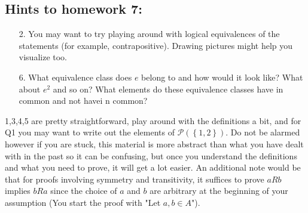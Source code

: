 \documentclass[letterpaper,12pt]{article}
\newcommand{\set}[1]{\left\{ #1 \right\}}
\begin{document}
\subsection*{Hints to homework 7:}
\begin{enumerate}
\item[2.] You may want to try playing around with logical equivalences of the statements (for example, contrapositive). Drawing pictures might help you visualize too.
\item[6.] What equivalence class does $e$ belong to and how would it look like? What about $e^2$ and so on? What elements do these equivalence classes have in common and not havei n common?
\end{enumerate}
1,3,4,5 are pretty straightforward, play around with the definitions a bit, and for Q1 you may want to write out the elements of $\mathcal{P}(\set{1,2})$. Do not be alarmed however if you are stuck, this material is more abstract than what you have dealt with in the past so it can be confusing, but once you understand the definitions and what you need to prove, it will get a lot easier. An additional note would be that for proofs involving symmetry and transitivity, it suffices to prove $aRb$ implies $bRa$ since the choice of $a$ and $b$ are arbitrary at the beginning of your assumption (You start the proof with "Let $a,b \in A$"). 
\end{document}
